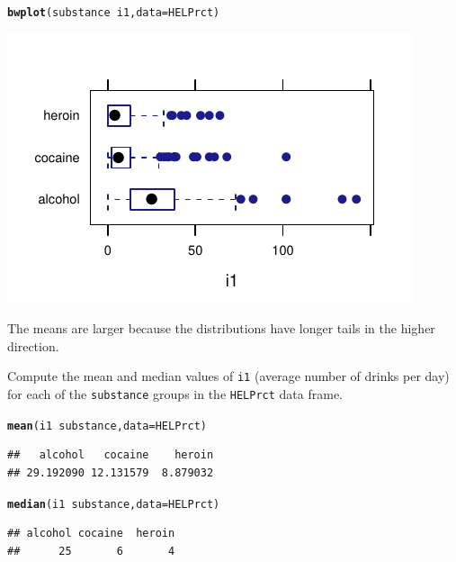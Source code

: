 \documentclass[twoside]{book}\usepackage[]{graphicx}\usepackage[]{xcolor}
\makeatletter
\def\maxwidth{ %
  \ifdim\Gin@nat@width>\linewidth
    \linewidth
  \else
    \Gin@nat@width
  \fi
}
\newcommand{\hlopt}[1]{\textcolor[rgb]{0,0,0}{#1}}%
\newcommand{\hlstd}[1]{\textcolor[rgb]{0.345,0.345,0.345}{#1}}%
\newcommand{\hlkwc}[1]{\textcolor[rgb]{0.333,0.667,0.333}{#1}}%
\newcommand{\hlkwd}[1]{\textcolor[rgb]{0.737,0.353,0.396}{\textbf{#1}}}%
\newenvironment{kframe}{%
 \def\at@end@of@kframe{}%
 \ifinner\ifhmode%
  \def\at@end@of@kframe{\end{minipage}}%
  \begin{minipage}{\columnwidth}%
 \fi\fi%
 \def\FrameCommand##1{\hskip\@totalleftmargin \hskip-\fboxsep
 \colorbox{shadecolor}{##1}\hskip-\fboxsep
     \hskip-\linewidth \hskip-\@totalleftmargin \hskip\columnwidth}%
 \MakeFramed {\advance\hsize-\width
   \@totalleftmargin\z@ \linewidth\hsize
   \@setminipage}}%
 {\par\unskip\endMakeFramed%
 \at@end@of@kframe}
\newenvironment{knitrout}{}{} %
\newcommand{\variable}[1]{{\color{green!50!black}\texttt{#1}}}
\newcommand{\Rindex}[1]{\index{\texttt{#1}}}
\newcommand{\dataframe}[1]{{\color{blue!80!black}\texttt{#1}}\Rindex{#1}}
\makeatother
\begin{document}
\begin{solution}
\begin{knitrout}
\color{fgcolor}\begin{kframe}
\begin{alltt}
\hlkwd{bwplot}\hlstd{(substance} \hlopt{~} \hlstd{i1,} \hlkwc{data}\hlstd{=HELPrct)}
\end{alltt}
\end{kframe}

{\centering \includegraphics[width=\maxwidth]{figures/fig-unnamed-chunk-43-1} 

}



\end{knitrout}
	The means are larger because the distributions have longer tails in the 
	higher direction.  
\end{solution}

\begin{problem}
	Compute the mean and median values of \variable{i1} (average number of
	drinks per day) for each of the \variable{substance} groups in the 
	\dataframe{HELPrct} data frame.
\end{problem}

\begin{solution}
\begin{knitrout}
\color{fgcolor}\begin{kframe}
\begin{alltt}
\hlkwd{mean}\hlstd{(i1} \hlopt{~} \hlstd{substance,} \hlkwc{data}\hlstd{=HELPrct)}
\end{alltt}
\begin{verbatim}
##   alcohol   cocaine    heroin 
## 29.192090 12.131579  8.879032
\end{verbatim}
\begin{alltt}
\hlkwd{median}\hlstd{(i1} \hlopt{~} \hlstd{substance,} \hlkwc{data}\hlstd{=HELPrct)}
\end{alltt}
\begin{verbatim}
## alcohol cocaine  heroin 
##      25       6       4
\end{verbatim}
\end{kframe}
\end{knitrout}
\end{solution}
\end{document}
